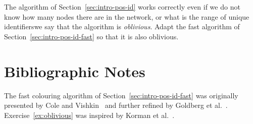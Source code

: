 \begin{exs}\label{ex:oblivious}
    The algorithm of Section~\ref{sec:intro-pos-id} works correctly even if we do not know how many nodes there are in the network, or what is the range of unique identifiers\mydash we say that the algorithm is \emph{oblivious}. Adapt the fast algorithm of Section~\ref{sec:intro-pos-id-fast} so that it is also oblivious.
\end{exs}


\section{Bibliographic Notes}

The fast colouring algorithm of Section~\ref{sec:intro-pos-id-fast} was originally presented by Cole and Vishkin~\cite{cole86deterministic} and further refined by Goldberg et al.~\cite{goldberg88parallel}. Exercise~\ref{ex:oblivious} was inspired by Korman et al.~\cite{korman11removing}.
